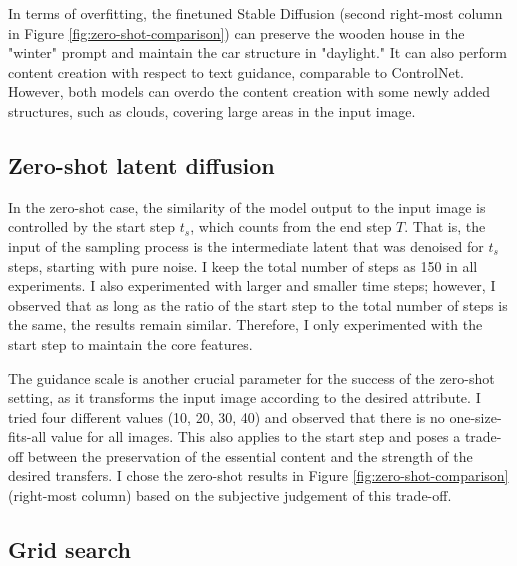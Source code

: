 In terms of overfitting, the finetuned Stable Diffusion (second right-most column in Figure \ref{fig:zero-shot-comparison}) can preserve the wooden house in the "winter" prompt and maintain the car structure in "daylight." It can also perform content creation with respect to text guidance, comparable to ControlNet. However, both models can overdo the content creation with some newly added structures, such as clouds, covering large areas in the input image.

\subsection{Zero-shot latent diffusion}
In the zero-shot case, the similarity of the model output to the input image is controlled by the start step  $t_s$, which counts from the end step  $T$. That is, the input of the sampling process is the intermediate latent that was denoised for $t_s$ steps, starting with pure noise. I keep the total number of steps as 150 in all experiments. I also experimented with larger and smaller time steps; however, I observed that as long as the ratio of the start step to the total number of steps is the same, the results remain similar. Therefore, I only experimented with the start step to maintain the core features.


The guidance scale is another crucial parameter for the success of the zero-shot setting, as it transforms the input image according to the desired attribute. I tried four different values (10, 20, 30, 40) and observed that there is no one-size-fits-all value for all images. This also applies to the start step and poses a trade-off between the preservation of the essential content and the strength of the desired transfers. I chose the zero-shot results in Figure \ref{fig:zero-shot-comparison}  (right-most column) based on the subjective judgement of this trade-off.

\subsection{Grid search}

